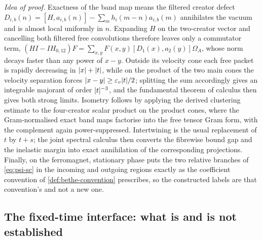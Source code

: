 \emph{Idea of proof.} Exactness of the band map means the filtered creator
defect $D_{i,b}(n)=[H,a_{i,b}(n)]-\sum_mh_i(m-n)a_{i,b}(m)$ annihilates the
vacuum and is almost local uniformly in $n$. Expanding $H$ on the two-creator
vector and cancelling both filtered free convolutions therefore leaves only a
commutator term,
$(HI-IH_{0,12})F=\sum_{x,y}F(x,y)[D_1(x),a_2(y)]\Omega_A$, whose norm decays
faster than any power of $x-y$. Outside its velocity cone each free packet is
rapidly decreasing in $\lvert x\rvert+\lvert t\rvert$, while on the product of the two main
cones the velocity separation forces $\lvert x-y\rvert\ge\varepsilon_v\lvert t\rvert/2$;
splitting the sum accordingly gives an integrable majorant of order
$\lvert t\rvert^{-3}$, and the fundamental theorem of calculus then gives both strong
limits. Isometry follows by applying the derived clustering estimate to the
four-creator scalar product on the product cones, where the Gram-normalised
exact band maps factorise into the free tensor Gram form, with the complement
again power-suppressed. Intertwining is the usual replacement of $t$ by $t+s$;
the joint spectral calculus then converts the fibrewise bound gap and the
inelastic margin into exact annihilation of the corresponding projections.
Finally, on the ferromagnet, stationary phase puts the two relative branches
of \cref{eq:psi-sc} in the incoming and outgoing regions exactly as the
coefficient convention of \cref{def:bethe-convention} prescribes, so the
constructed labels are that convention's and not a new one.

\subsection{The fixed-time interface: what is and is not established}

